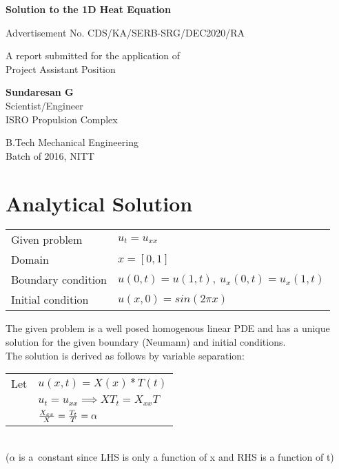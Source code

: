 \documentclass[12pt]{article}
\author{Sundaresan G}
\begin{document}
	
\begin{titlepage}
	\begin{center}
		\vspace*{1cm}
		
		\textbf{\Large{Solution to the 1D Heat Equation}}
		
		\vspace{0.5cm}
		Advertisement No. CDS/KA/SERB-SRG/DEC2020/RA
		
		\vspace{1.5cm}
		
		A report submitted for the application of\\
		Project Assistant Position
		
		
		\vfill
		
		\textbf{\large{Sundaresan G}}\\
		Scientist/Engineer\\
		ISRO Propulsion Complex
		
		\vspace{0.8cm}
		
		B.Tech Mechanical Engineering\\
		Batch of 2016, NITT\\
		
	\end{center}
\end{titlepage}
	\section{Analytical Solution}
	\begin{center}
		\begin{tabular}{l l}
			Given problem & $u_t=u_{xx}$\\		
			Domain & $x=[0,1]$\\
			Boundary condition & $u(0,t)=u(1,t),\
			u_x(0,t)=u_x(1,t)$\\
			Initial condition & $u(x,0)=sin(2\pi x)$
		\end{tabular}
	\end{center}
	The given problem is a well posed homogenous linear PDE and has a unique solution for the given boundary (Neumann) and initial conditions.\\
	The solution is derived as follows by variable separation:\\
	
	\begin{tabular}{r l}
		Let & $u(x,t)=X(x)*T(t)$ \\
		& $u_t=u_{xx} \implies XT_t=X_{xx}T$ \\
		& ${X_{xx}\over X} = {T_t \over T} = \alpha$
		
				
	\end{tabular} \\
	($\alpha$ is a\ constant since LHS is only a function of x and RHS is a function of t)\\
	
\end{document}
